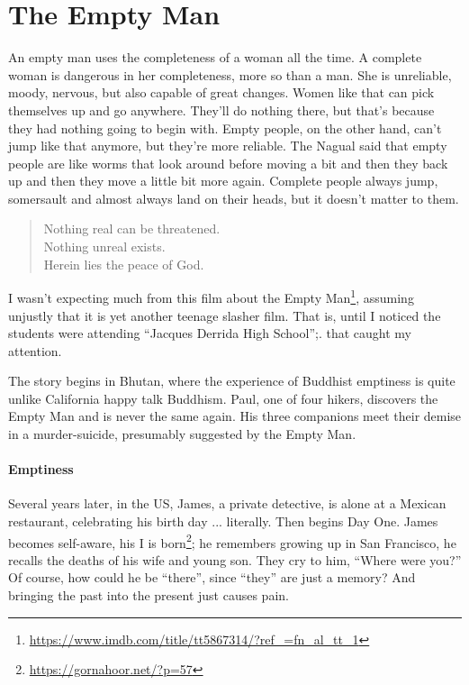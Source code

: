 \section{The Empty Man}

\begin{quotex}
An empty man uses the completeness of a woman all the time. A complete woman is dangerous in her completeness, more so than a man. She is unreliable, moody, nervous, but also capable of great changes. Women like that can pick themselves up and go anywhere. They'll do nothing there, but that's because they had nothing going to begin with. Empty people, on the other hand, can't jump like that anymore, but they're more reliable. The Nagual said that empty people are like worms that look around before moving a bit and then they back up and then they move a little bit more again. Complete people always jump, somersault and almost always land on their heads, but it doesn't matter to them.

\begin{verse}
Nothing real can be threatened.\\
Nothing unreal exists.\\
Herein lies the peace of God.
\end{verse}
\end{quotex}


I wasn't expecting much from this film about the Empty Man\footnote{\url{https://www.imdb.com/title/tt5867314/?ref\_=fn\_al\_tt\_1}}, assuming unjustly that it is yet another teenage slasher film. That is, until I noticed the students were attending ``Jacques Derrida High School'';. that caught my attention.

The story begins in Bhutan, where the experience of Buddhist emptiness is quite unlike California happy talk Buddhism. Paul, one of four hikers, discovers the Empty Man and is never the same again. His three companions meet their demise in a murder-suicide, presumably suggested by the Empty Man.

\paragraph{Emptiness}


Several years later, in the US, James, a private detective, is alone at a Mexican restaurant, celebrating his birth day ... literally. Then begins Day One. James becomes self-aware, his I is born\footnote{\url{https://gornahoor.net/?p=57}}; he remembers growing up in San Francisco, he recalls the deaths of his wife and young son. They cry to him, ``Where were you?'' Of course, how could he be ``there'', since ``they'' are just a memory? And bringing the past into the present just causes pain.

